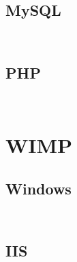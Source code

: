 \section{MySQL}


\begin{lstlisting}[language=bash]

\end{lstlisting}



\begin{lstlisting}[language=bash]

\end{lstlisting}



\section{PHP}


\begin{lstlisting}[language=bash]

\end{lstlisting}



\begin{lstlisting}[language=bash]

\end{lstlisting}


\chapter{WIMP}



\section{Windows}



\begin{lstlisting}[language=bash]

\end{lstlisting}



\begin{lstlisting}[language=bash]

\end{lstlisting}


\section{IIS}



